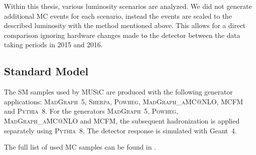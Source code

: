 Within this thesis, various luminosity scenarios are analyzed. We did not generate additional \ac{MC} events for each scenario, instead the events are scaled to the described luminosity with the method mentioned above. This allows for a direct comparison ignoring hardware changes made to the detector between the data taking periods in 2015 and 2016.


\subsection{Standard Model}

\newcommand{\genAM}{\textsc{MadGraph\_aMC@NLO}\xspace}
\newcommand{\genBM}{\textsc{BlackMax}\xspace}
\newcommand{\genCA}{\textsc{CalcHEP}\xspace}
\newcommand{\genMG}{\textsc{MadGraph~5}\xspace}
\newcommand{\genPH}{\textsc{Powheg}\xspace}
\newcommand{\genPY}{\textsc{Pythia~8}\xspace}
\newcommand{\genQBH}{\textsc{QBH~2.0}\xspace}
\newcommand{\genSP}{\textsc{Sherpa}\xspace}
\newcommand{\genMCFM}{\textsc{MCFM}\xspace}

\newcommand{\genGEANT}{Geant~4\xspace}

The \ac{SM} samples used by \ac{MUSiC} are produced with the following generator applications: \genMG\cite{Alwall:MadGraph5}, \genSP\cite{Gleisberg:EventgenerationSHERPA}, \genPH\cite{Frixione:MatchingNLOQCDa,Alioli:generalframeworkimplementing}, \genAM\cite{Alwall:automatedcomputationtreea}, \genMCFM\cite{Campbell:Vectorbosonpaira} and \genPY\cite{Sjoestrand:BriefIntroductionPYTHIA}. For the generators \genMG, \genPH, \genAM and \genMCFM, the subsequent hadronization is applied separately using \genPY.
The detector response is simulated with \genGEANT \cite{Agostinelli:GEANT4asimulationtoolkit}.

The full list of used \ac{MC} samples can be found in .

